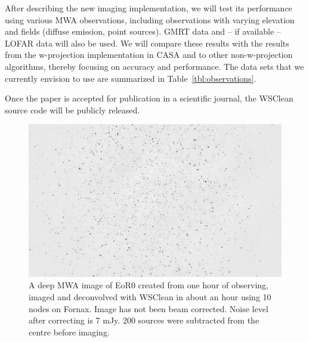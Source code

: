 \documentclass[a4paper,10pt]{article}
\begin{document}
After describing the new imaging implementation, we will test its performance using various MWA observations, including observations with varying elevation and fields (diffuse emission, point sources). GMRT data and -- if available -- LOFAR data will also be used. We will compare these results with the results from the w-projection implementation in CASA and to other non-w-projection algorithms, thereby focusing on accuracy and performance. The data sets that we currently envision to use are summarized in Table~\ref{tbl:observations}.

Once the paper is accepted for publication in a scientific journal, the WSClean source code will be publicly released.

\begin{figure}[bh]
\begin{center}
\includegraphics[width=12cm]{EoR0-apparent.png}
\caption{A deep MWA image of EoR0 created from one hour of observing, imaged and deconvolved with WSClean in about an hour using 10 nodes on Fornax. Image has not been beam corrected. Noise level after correcting is 7 mJy. 200 sources were subtracted from the centre before imaging.}
\label{fig:stddev-spectrum}
\end{center}
\end{figure}
\end{document}
